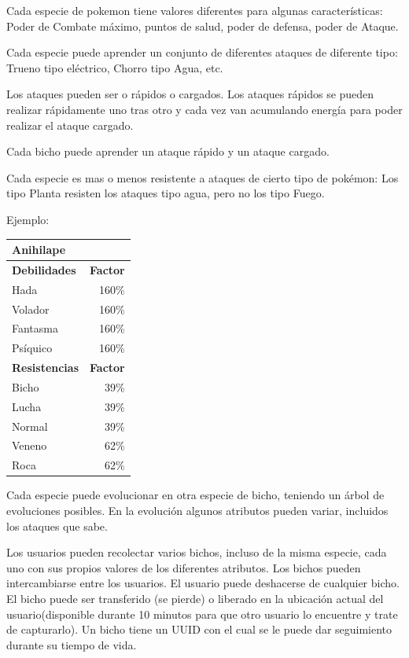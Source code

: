 \documentclass[
  letterpaper,
  DIV=11,
  numbers=noendperiod]{scrreprt}
\begin{document}
Cada especie de pokemon tiene valores diferentes para algunas
características: Poder de Combate máximo, puntos de salud, poder de
defensa, poder de Ataque.

Cada especie puede aprender un conjunto de diferentes ataques de
diferente tipo: Trueno tipo eléctrico, Chorro tipo Agua, etc.

Los ataques pueden ser o rápidos o cargados. Los ataques rápidos se
pueden realizar rápidamente uno tras otro y cada vez van acumulando
energía para poder realizar el ataque cargado.

Cada bicho puede aprender un ataque rápido y un ataque cargado.

Cada especie es mas o menos resistente a ataques de cierto tipo de
pokémon: Los tipo Planta resisten los ataques tipo agua, pero no los
tipo Fuego.

Ejemplo:

\begin{longtable}[]{@{}lr@{}}
\toprule\noalign{}
\textbf{Anihilape} & \\
\midrule\noalign{}
\endhead
\bottomrule\noalign{}
\endlastfoot
\textbf{Debilidades} & \textbf{Factor} \\
Hada & 160\% \\
Volador & 160\% \\
Fantasma & 160\% \\
Psíquico & 160\% \\
\textbf{Resistencias} & \textbf{Factor} \\
Bicho & 39\% \\
Lucha & 39\% \\
Normal & 39\% \\
Veneno & 62\% \\
Roca & 62\% \\
\end{longtable}

Cada especie puede evolucionar en otra especie de bicho, teniendo un
árbol de evoluciones posibles. En la evolución algunos atributos pueden
variar, incluidos los ataques que sabe.

Los usuarios pueden recolectar varios bichos, incluso de la misma
especie, cada uno con sus propios valores de los diferentes atributos.
Los bichos pueden intercambiarse entre los usuarios. El usuario puede
deshacerse de cualquier bicho. El bicho puede ser transferido (se
pierde) o liberado en la ubicación actual del usuario(disponible durante
10 minutos para que otro usuario lo encuentre y trate de capturarlo). Un
bicho tiene un UUID con el cual se le puede dar seguimiento durante su
tiempo de vida.
\end{document}
